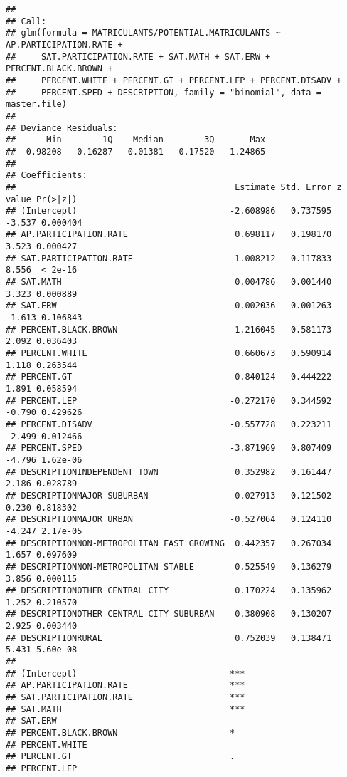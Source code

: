 \documentclass[
]{article}
\begin{document}
\begin{verbatim}
## 
## Call:
## glm(formula = MATRICULANTS/POTENTIAL.MATRICULANTS ~ AP.PARTICIPATION.RATE + 
##     SAT.PARTICIPATION.RATE + SAT.MATH + SAT.ERW + PERCENT.BLACK.BROWN + 
##     PERCENT.WHITE + PERCENT.GT + PERCENT.LEP + PERCENT.DISADV + 
##     PERCENT.SPED + DESCRIPTION, family = "binomial", data = master.file)
## 
## Deviance Residuals: 
##      Min        1Q    Median        3Q       Max  
## -0.98208  -0.16287   0.01381   0.17520   1.24865  
## 
## Coefficients:
##                                           Estimate Std. Error z value Pr(>|z|)
## (Intercept)                              -2.608986   0.737595  -3.537 0.000404
## AP.PARTICIPATION.RATE                     0.698117   0.198170   3.523 0.000427
## SAT.PARTICIPATION.RATE                    1.008212   0.117833   8.556  < 2e-16
## SAT.MATH                                  0.004786   0.001440   3.323 0.000889
## SAT.ERW                                  -0.002036   0.001263  -1.613 0.106843
## PERCENT.BLACK.BROWN                       1.216045   0.581173   2.092 0.036403
## PERCENT.WHITE                             0.660673   0.590914   1.118 0.263544
## PERCENT.GT                                0.840124   0.444222   1.891 0.058594
## PERCENT.LEP                              -0.272170   0.344592  -0.790 0.429626
## PERCENT.DISADV                           -0.557728   0.223211  -2.499 0.012466
## PERCENT.SPED                             -3.871969   0.807409  -4.796 1.62e-06
## DESCRIPTIONINDEPENDENT TOWN               0.352982   0.161447   2.186 0.028789
## DESCRIPTIONMAJOR SUBURBAN                 0.027913   0.121502   0.230 0.818302
## DESCRIPTIONMAJOR URBAN                   -0.527064   0.124110  -4.247 2.17e-05
## DESCRIPTIONNON-METROPOLITAN FAST GROWING  0.442357   0.267034   1.657 0.097609
## DESCRIPTIONNON-METROPOLITAN STABLE        0.525549   0.136279   3.856 0.000115
## DESCRIPTIONOTHER CENTRAL CITY             0.170224   0.135962   1.252 0.210570
## DESCRIPTIONOTHER CENTRAL CITY SUBURBAN    0.380908   0.130207   2.925 0.003440
## DESCRIPTIONRURAL                          0.752039   0.138471   5.431 5.60e-08
##                                             
## (Intercept)                              ***
## AP.PARTICIPATION.RATE                    ***
## SAT.PARTICIPATION.RATE                   ***
## SAT.MATH                                 ***
## SAT.ERW                                     
## PERCENT.BLACK.BROWN                      *  
## PERCENT.WHITE                               
## PERCENT.GT                               .  
## PERCENT.LEP                                 

\end{verbatim}
\end{document}
